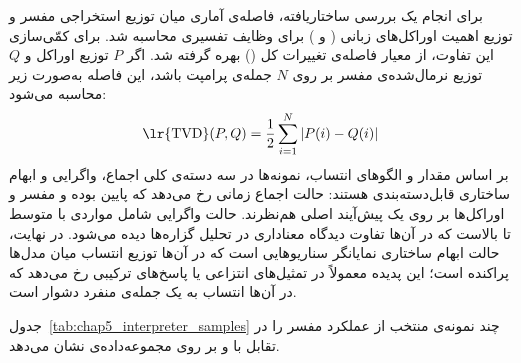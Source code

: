 برای انجام یک بررسی ساختاریافته، فاصله‌ی آماری میان توزیع استخراجی مفسر  و توزیع اهمیت اوراکل‌های زبانی ( و ) برای وظایف تفسیری محاسبه شد. برای کمّی‌سازی این تفاوت، از معیار فاصله‌ی تغییرات کل () بهره گرفته شد. اگر $P$ توزیع اوراکل و $Q$ توزیع نرمال‌شده‌ی مفسر بر روی $N$ جمله‌ی پرامپت باشد، این فاصله به‌صورت زیر محاسبه می‌شود:
\begin{equation}\label{eq:chap5_tvd}
    \text{\lr{TVD}}(P, Q) = \frac{1}{2} \sum_{i=1}^{N} |P(i) - Q(i)|
\end{equation}
بر اساس مقدار  و الگوهای انتساب، نمونه‌ها در سه دسته‌ی کلی اجماع، واگرایی و ابهام ساختاری قابل‌دسته‌بندی هستند:
حالت اجماع زمانی رخ می‌دهد که  پایین بوده و مفسر و اوراکل‌ها بر روی یک پیش‌آیند اصلی هم‌نظرند. 
حالت واگرایی شامل مواردی با  متوسط تا بالاست که در آن‌ها تفاوت دیدگاه معناداری در تحلیل گزاره‌ها دیده می‌شود. 
در نهایت، حالت ابهام ساختاری نمایانگر سناریوهایی است که در آن‌ها توزیع انتساب میان مدل‌ها پراکنده است؛ این پدیده معمولاً در تمثیل‌های انتزاعی یا پاسخ‌های ترکیبی رخ می‌دهد که در آن‌ها انتساب به یک جمله‌ی منفرد دشوار است.

جدول~\ref{tab:chap5_interpreter_samples} چند نمونه‌ی منتخب از عملکرد مفسر  را در تقابل با  و  بر روی مجموعه‌داده‌ی  نشان می‌دهد.

